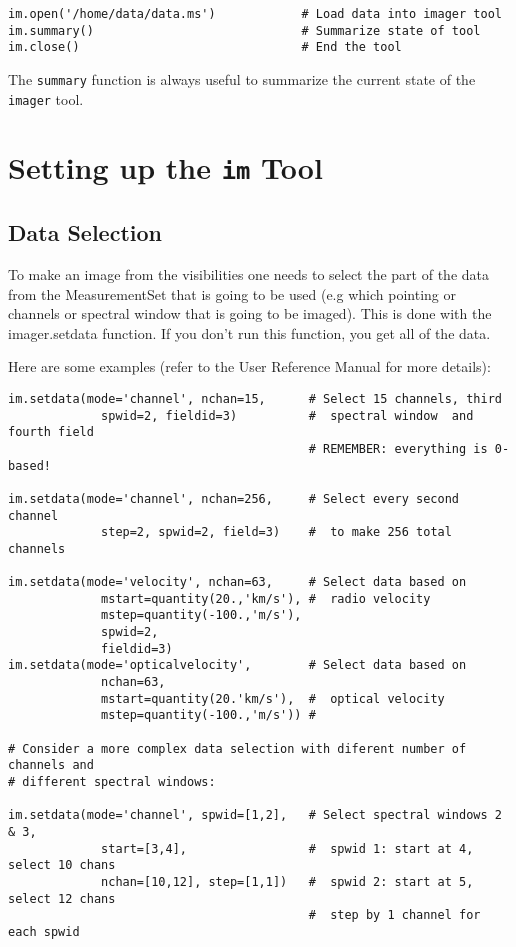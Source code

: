 \small
\begin{verbatim}
im.open('/home/data/data.ms')            # Load data into imager tool
im.summary()                             # Summarize state of tool
im.close()                               # End the tool
\end{verbatim}
\normalsize

The {\tt summary} function is always useful to summarize the current
state of the {\tt imager} tool.

\section{Setting up the {\tt im} Tool}
\label{section:imtool.setdata}

\subsection{Data Selection}
\label{section:imtool.setdata.select}

To make an image from the visibilities one needs to select the part of
the data from the MeasurementSet that is going to be used (e.g which
pointing or channels or spectral window that is going to be imaged).
This is done with the imager.setdata function.  If you don't run this
function, you get all of the data.

Here are some examples (refer to the User Reference Manual for more
details):

\small
\begin{verbatim}
im.setdata(mode='channel', nchan=15,      # Select 15 channels, third
             spwid=2, fieldid=3)          #  spectral window  and fourth field
                                          # REMEMBER: everything is 0-based!

im.setdata(mode='channel', nchan=256,     # Select every second channel
             step=2, spwid=2, field=3)    #  to make 256 total channels

im.setdata(mode='velocity', nchan=63,     # Select data based on
             mstart=quantity(20.,'km/s'), #  radio velocity
             mstep=quantity(-100.,'m/s'),
             spwid=2,
             fieldid=3)
im.setdata(mode='opticalvelocity',        # Select data based on
             nchan=63,
             mstart=quantity(20.'km/s'),  #  optical velocity
             mstep=quantity(-100.,'m/s')) #

# Consider a more complex data selection with diferent number of channels and
# different spectral windows:

im.setdata(mode='channel', spwid=[1,2],   # Select spectral windows 2 & 3,
             start=[3,4],                 #  spwid 1: start at 4, select 10 chans
             nchan=[10,12], step=[1,1])   #  spwid 2: start at 5, select 12 chans
                                          #  step by 1 channel for each spwid
\end{verbatim}
\normalsize

